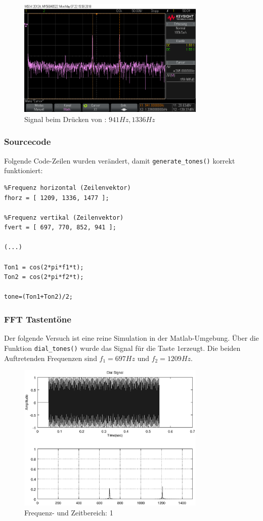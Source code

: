 \documentclass[a4paper]{article}
\begin{document}
\begin{figure}[H]
    \centering
    \includegraphics[width=0.8\textwidth]{aufgabe4_0.png}
    \caption{Signal beim Drücken von \grqq: $941\si{Hz}, 1336\si{Hz}$}
    \label{fig:aufgabe4-0}
\end{figure}

\subsubsection{Sourcecode}
Folgende Code-Zeilen wurden verändert, damit \lstinline{generate_tones()} korrekt funktioniert:
\begin{lstlisting}
%Frequenz horizontal (Zeilenvektor)
fhorz = [ 1209, 1336, 1477 ];

%Frequenz vertikal (Zeilenvektor)
fvert = [ 697, 770, 852, 941 ];

(...)

Ton1 = cos(2*pi*f1*t);
Ton2 = cos(2*pi*f2*t);

tone=(Ton1+Ton2)/2;
\end{lstlisting}

\subsubsection{FFT Tastentöne}
Der folgende Versuch ist eine reine Simulation in der Matlab-Umgebung.
Über die Funktion \lstinline{dial_tones()} wurde das Signal für die Taste \glqq$1$\grqq erzeugt.
Die beiden Auftretenden Frequenzen sind $f_1=697\si{Hz}$ und $f_2=1209\si{Hz}$.

\begin{figure}[H]
    \centering
    \includegraphics[width=0.8\textwidth, keepaspectratio]{nummer_1_fft.eps}
    \caption{Frequenz- und Zeitbereich: 1}
    \label{fig:nummer-1-fft}
\end{figure}
\end{document}
